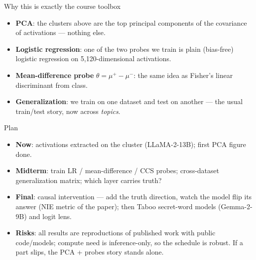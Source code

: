 \documentclass[aspectratio=169,10pt]{beamer}
\begin{document}
\begin{frame}{Why this is exactly the course toolbox}
  \begin{itemize}
    \item \textbf{PCA}: the clusters above are the top principal components of the
          covariance of activations --- nothing else.
    \item \textbf{Logistic regression}: one of the two probes we train is plain
          (bias-free) logistic regression on 5{,}120-dimensional activations.
    \item \textbf{Mean-difference probe} $\theta = \mu^{+} - \mu^{-}$: the same idea as
          Fisher's linear discriminant from class.
    \item \textbf{Generalization}: we train on one dataset and test on another ---
          the usual train/test story, now across \emph{topics}.
  \end{itemize}
\end{frame}

\begin{frame}{Plan}
  \begin{itemize}
    \item \textbf{Now}: activations extracted on the cluster (LLaMA-2-13B);
          first PCA figure done.
    \item \textbf{Midterm}: train LR / mean-difference / CCS probes;
          cross-dataset generalization matrix; which layer carries truth?
    \item \textbf{Final}: causal intervention --- add the truth direction, watch the
          model flip its answer (NIE metric of the paper); then Taboo secret-word
          models (Gemma-2-9B) and logit lens.
    \item \textbf{Risks}: all results are reproductions of published work with
          public code/models; compute need is inference-only, so the schedule is
          robust. If a part slips, the PCA + probes story stands alone.
  \end{itemize}
\end{frame}
\end{document}
